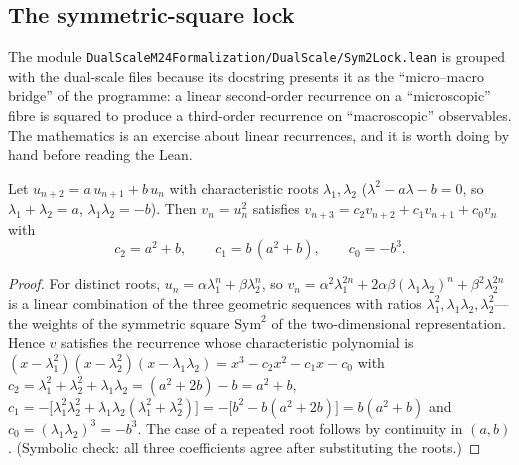 \subsection{The symmetric-square lock}

The module \texttt{DualScaleM24Formalization/DualScale/Sym2Lock.lean} is grouped with the
dual-scale files because its docstring presents it as the ``micro--macro bridge'' of the
programme: a linear second-order recurrence on a ``microscopic'' fibre is squared to produce a
third-order recurrence on ``macroscopic'' observables. The mathematics is an exercise about
linear recurrences, and it is worth doing by hand before reading the Lean.

\begin{lemma}\label{thm:dualscale:sym2}
Let $u_{n+2}=a\,u_{n+1}+b\,u_n$ with characteristic roots $\lambda_1,\lambda_2$
($\lambda^2-a\lambda-b=0$, so $\lambda_1+\lambda_2=a$, $\lambda_1\lambda_2=-b$). Then
$v_n=u_n^2$ satisfies $v_{n+3}=c_2v_{n+2}+c_1v_{n+1}+c_0v_n$ with
\begin{equation}\label{eq:dualscale:sym2}
 c_2=a^2+b,\qquad c_1=b\,(a^2+b),\qquad c_0=-b^3 .
\end{equation}
\end{lemma}
\begin{proof}
For distinct roots, $u_n=\alpha\lambda_1^n+\beta\lambda_2^n$, so
$v_n=\alpha^2\lambda_1^{2n}+2\alpha\beta(\lambda_1\lambda_2)^n+\beta^2\lambda_2^{2n}$ is a
linear combination of the three geometric sequences with ratios
$\lambda_1^2,\lambda_1\lambda_2,\lambda_2^2$---the weights of the symmetric square
$\mathrm{Sym}^2$ of the two-dimensional representation. Hence $v$ satisfies the recurrence
whose characteristic polynomial is
$(x-\lambda_1^2)(x-\lambda_2^2)(x-\lambda_1\lambda_2)=x^3-c_2x^2-c_1x-c_0$ with
$c_2=\lambda_1^2+\lambda_2^2+\lambda_1\lambda_2=(a^2+2b)-b=a^2+b$,
$c_1=-\big[\lambda_1^2\lambda_2^2+\lambda_1\lambda_2(\lambda_1^2+\lambda_2^2)\big]
 =-\big[b^2-b(a^2+2b)\big]=b(a^2+b)$ and $c_0=(\lambda_1\lambda_2)^3=-b^3$. The case of a
repeated root follows by continuity in $(a,b)$. (Symbolic check: all three coefficients agree
after substituting the roots.)
\end{proof}

